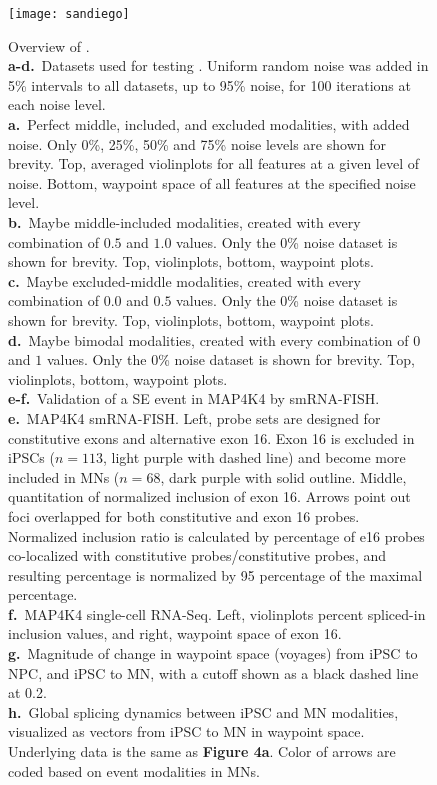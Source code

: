 \begin{figure}[h] 
  \centering
  \texttt{[image: sandiego]}
  \caption[Overview of \bonvoyage.]{Overview of \bonvoyage.\\
\textbf{a-d.}~Datasets used for testing \bonvoyage. Uniform random noise was added in 5\% intervals to all datasets, up to 95\% noise, for 100 iterations at each noise level.\\
\textbf{a.}~Perfect middle, included, and excluded modalities, with added noise. Only 0\%, 25\%, 50\% and 75\% noise levels are shown for brevity. Top, averaged violinplots for all features at a given level of noise. Bottom, waypoint space of all features at the specified noise level.\\
\textbf{b.}~Maybe middle-included modalities, created with every combination of $0.5$ and $1.0$ values. Only the 0\% noise dataset is shown for brevity. Top, violinplots, bottom, waypoint plots.\\
\textbf{c.}~Maybe excluded-middle modalities, created with every combination of $0.0$ and $0.5$ values. Only the 0\% noise dataset is shown for brevity. Top, violinplots, bottom, waypoint plots.\\
\textbf{d.}~Maybe bimodal modalities, created with every combination of $0$ and $1$ values. Only the 0\% noise dataset is shown for brevity. Top, violinplots, bottom, waypoint plots.\\
\textbf{e-f.}~Validation of a SE event in MAP4K4 by smRNA-FISH. \\
\textbf{e.}~MAP4K4 smRNA-FISH. Left, probe sets are designed for constitutive exons and alternative exon 16. Exon 16 is excluded in iPSCs ($n = 113$, light purple with dashed line) and become more included in MNs ($n = 68$, dark purple with solid outline. Middle, quantitation of normalized inclusion of exon 16. Arrows point out foci overlapped for both constitutive and exon 16 probes. Normalized inclusion ratio is calculated by percentage of e16 probes co-localized with constitutive probes/constitutive probes, and resulting percentage is normalized by 95 percentage of the maximal percentage. \\
\textbf{f.}~MAP4K4 single-cell RNA-Seq. Left, violinplots percent spliced-in inclusion values, and right, waypoint space of exon 16.\\
\textbf{g.}~Magnitude of change in waypoint space (voyages) from iPSC to NPC, and iPSC to MN, with a cutoff shown as a black dashed line at 0.2.\\
\textbf{h.}~Global splicing dynamics between iPSC and MN modalities, visualized as vectors from iPSC to MN  in waypoint space. Underlying data is the same as \textbf{Figure 4a}. Color of arrows are coded based on event modalities in MNs.
}
\label{fig:bonvoyage}
\end{figure}




